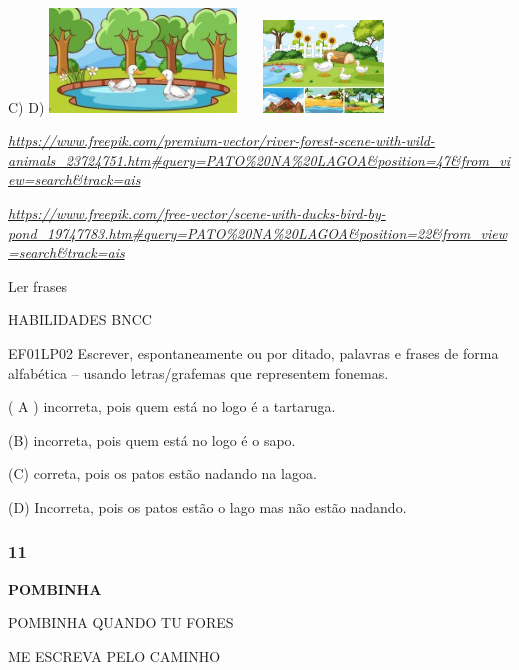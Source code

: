 \begin{escola}
C) D)
\includegraphics[width=1.96319in,height=1.09028in]{media/image252.jpg}\includegraphics[width=1.78681in,height=0.96806in]{media/image253.jpg}

\href{https://www.freepik.com/premium-vector/river-forest-scene-with-wild-animals_23724751.htm\#query=PATO\%20NA\%20LAGOA\&position=47\&from_view=search\&track=ais}{\emph{https://www.freepik.com/premium-vector/river-forest-scene-with-wild-animals\_23724751.htm\#query=PATO\%20NA\%20LAGOA\&position=47\&from\_view=search\&track=ais}}

\href{https://www.freepik.com/free-vector/scene-with-ducks-bird-by-pond_19747783.htm\#query=PATO\%20NA\%20LAGOA\&position=22\&from_view=search\&track=ais}{\emph{https://www.freepik.com/free-vector/scene-with-ducks-bird-by-pond\_19747783.htm\#query=PATO\%20NA\%20LAGOA\&position=22\&from\_view=search\&track=ais}}

Ler frases

HABILIDADES BNCC

EF01LP02 Escrever, espontaneamente ou por ditado, palavras e frases de
forma alfabética -- usando letras/grafemas que representem fonemas.

( A ) incorreta, pois quem está no logo é a tartaruga.

(B) incorreta, pois quem está no logo é o sapo.

(C) correta, pois os patos estão nadando na lagoa.

(D) Incorreta, pois os patos estão o lago mas não estão nadando.

\subsubsection{11 }\label{section-83}

\textbf{POMBINHA}

POMBINHA QUANDO TU FORES

ME ESCREVA PELO CAMINHO


\end{escola}
